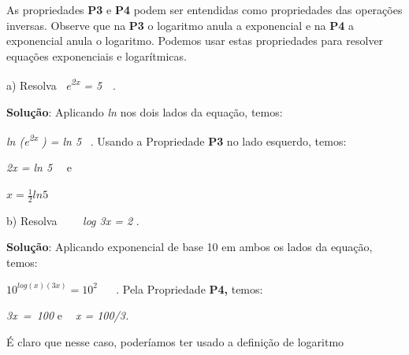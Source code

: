 \begin{texemplo}
    As propriedades \textbf{P3} e \textbf{P4} podem ser entendidas como propriedades das operações inversas. Observe que na \textbf{P3} o logaritmo anula a exponencial e na \textbf{P4} a exponencial anula o logaritmo. Podemos usar estas propriedades para resolver equações exponenciais e logarítmicas.

    a) Resolva~ \textit{e\textsuperscript{2x} = 5}~~.  

    \textbf{Solução}: Aplicando \textit{ln} nos dois lados da equação, temos:

    \textit{ln (e\textsuperscript{2x} ) = ln 5}~ . Usando a Propriedade \textbf{P3} no lado esquerdo, temos:

    \textit{2x = ln 5}~~ e

    \( x=\frac{1}{2}ln5 \) \qedsymbol{}

    b) Resolva~~~~ \textit{log 3x = 2} . 

    \textbf{Solução}: Aplicando exponencial de base 10 em ambos os lados da equação, temos:

    \( 10^{log(x) \left( 3x \right) }=10^{2} \) ~~ . Pela Propriedade \textbf{P4,} temos:

    \textit{3x~=~100   }e \textit{~ x = 100/3.}

    É claro que nesse caso, poderíamos ter usado a definição de logaritmo\qedsymbol{}

\end{texemplo}


